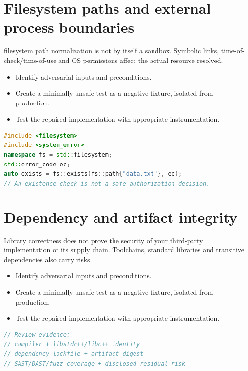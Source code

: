 \documentclass[11pt]{article}
\begin{document}
\section{Filesystem paths and external process boundaries}
filesystem path normalization is not by itself a sandbox. Symbolic links, time-of-check/time-of-use and OS permissions affect the actual resource resolved.

\begin{itemize}[leftmargin=*,itemsep=1pt,topsep=3pt]
\item Identify adversarial inputs and preconditions.
\item Create a minimally unsafe test as a negative fixture, isolated from production.
\item Test the repaired implementation with appropriate instrumentation.
\end{itemize}
\begin{lstlisting}[language=C++]
#include <filesystem>
#include <system_error>
namespace fs = std::filesystem;
std::error_code ec;
auto exists = fs::exists(fs::path{"data.txt"}, ec);
// An existence check is not a safe authorization decision.
\end{lstlisting}
\section{Dependency and artifact integrity}
Library correctness does not prove the security of your third-party implementation or its supply chain. Toolchains, standard libraries and transitive dependencies also carry risks.

\begin{itemize}[leftmargin=*,itemsep=1pt,topsep=3pt]
\item Identify adversarial inputs and preconditions.
\item Create a minimally unsafe test as a negative fixture, isolated from production.
\item Test the repaired implementation with appropriate instrumentation.
\end{itemize}
\begin{lstlisting}[language=C++]
// Review evidence:
// compiler + libstdc++/libc++ identity
// dependency lockfile + artifact digest
// SAST/DAST/fuzz coverage + disclosed residual risk
\end{lstlisting}
\end{document}
